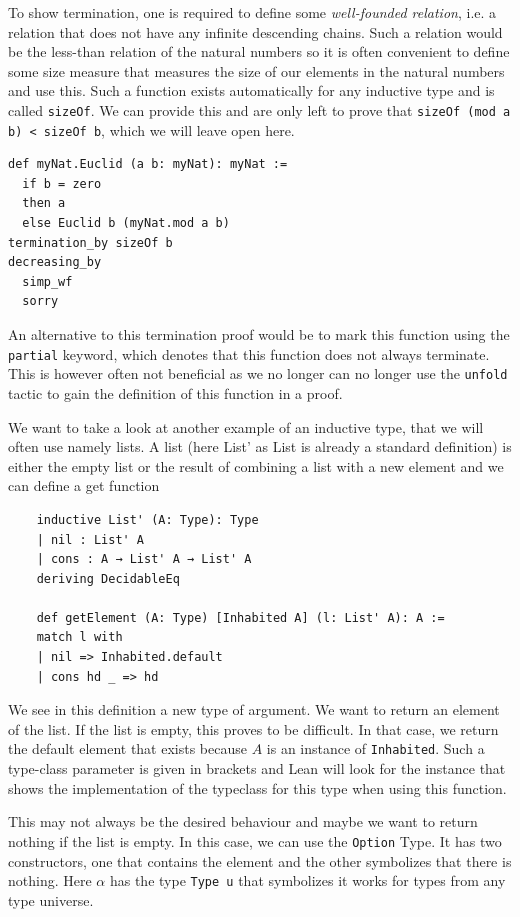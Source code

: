 To show termination, one is required to define some \textit{well-founded relation}, i.e. a relation that does not have any infinite descending chains. Such a relation would be the less-than relation of the natural numbers so it is often convenient to define some size measure that measures the size of our elements in the natural numbers and use this. Such a function exists automatically for any inductive type and is called \lstinline|sizeOf|. We can provide this and are only left to prove that \lstinline|sizeOf (mod a b) < sizeOf b|, which we will leave open here.

\begin{lstlisting}
def myNat.Euclid (a b: myNat): myNat :=
  if b = zero
  then a
  else Euclid b (myNat.mod a b)
termination_by sizeOf b
decreasing_by
  simp_wf
  sorry
\end{lstlisting}

An alternative to this termination proof would be to mark this function using the \lstinline|partial| keyword, which denotes that this function does not always terminate. This is however often not beneficial as we no longer can no longer use the \lstinline|unfold| tactic to gain the definition of this function in a proof.



We want to take a look at another example of an inductive type, that we will often use namely lists. A list (here List' as List is already a standard definition) is either the empty list or the result of combining a list with a new element and we can define a get function

\begin{lstlisting}
    inductive List' (A: Type): Type
    | nil : List' A
    | cons : A → List' A → List' A
    deriving DecidableEq

    def getElement (A: Type) [Inhabited A] (l: List' A): A :=
    match l with
    | nil => Inhabited.default
    | cons hd _ => hd
\end{lstlisting}

We see in this definition a new type of argument. We want to return an element of the list. If the list is empty, this proves to be difficult. In that case, we return the default element that exists because $A$ is an instance of \lstinline|Inhabited|. Such a type-class parameter is given in brackets and Lean will look for the instance that shows the implementation of the typeclass for this type when using this function.

This may not always be the desired behaviour and maybe we want to return nothing if the list is empty. In this case, we can use the \lstinline|Option| Type. It has two constructors, one that contains the element and the other symbolizes that there is nothing. Here $\alpha$ has the type \lstinline|Type u| that symbolizes it works for types from any type universe.

